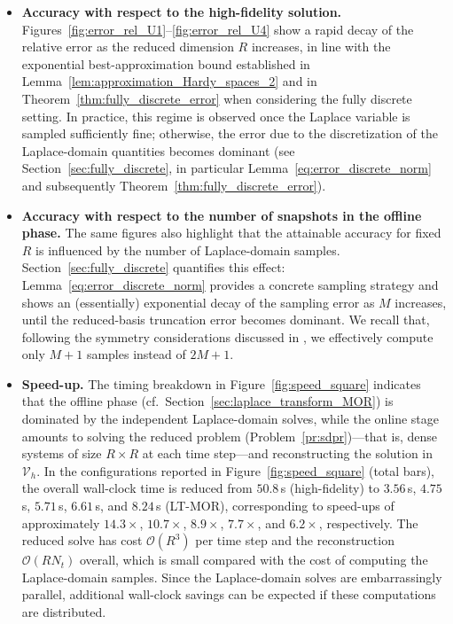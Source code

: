 \begin{itemize}
    \item[(i)]
    {\bf Accuracy with respect to the high-fidelity solution.}
    Figures~\ref{fig:error_rel_U1}--\ref{fig:error_rel_U4} show a rapid decay of the relative error as the reduced dimension $R$ increases, in line with the exponential best-approximation bound established in Lemma~\ref{lem:approximation_Hardy_spaces_2}
    and in Theorem~\ref{thm:fully_discrete_error} when considering the fully discrete setting. In practice, this regime is observed once the Laplace variable is sampled sufficiently fine; otherwise, the error due to the discretization of the Laplace-domain quantities becomes dominant (see Section~\ref{sec:fully_discrete}, in particular Lemma~\ref{eq:error_discrete_norm} and subsequently Theorem~\ref{thm:fully_discrete_error}).

    \item[(ii)]
    {\bf Accuracy with respect to the number of snapshots in the offline phase.}
    The same figures also highlight that the attainable accuracy for fixed $R$ is influenced by the number of Laplace-domain samples. Section~\ref{sec:fully_discrete} quantifies this effect: Lemma~\ref{eq:error_discrete_norm} provides a concrete sampling strategy and shows an (essentially) exponential decay of the sampling error as $M$ increases, until the reduced-basis truncation error becomes dominant. We recall that, following the symmetry considerations discussed in \cite[Section~5.4]{henriquez2024fast}, we effectively compute only $M+1$ samples instead of $2M+1$.

    \item[(iii)]
    {\bf Speed-up.}
    The timing breakdown in Figure~\ref{fig:speed_square} indicates that the offline phase (cf.~Section~\ref{sec:laplace_transform_MOR}) is dominated by the independent Laplace-domain solves, while the online stage amounts to solving the reduced problem (Problem~\ref{pr:sdpr})---that is, dense systems of size $R\times R$ at each time step---and reconstructing the solution in $\mathcal{V}_h$. In the configurations reported in Figure~\ref{fig:speed_square} (total bars), the overall wall-clock time is reduced from $50.8\,$s (high-fidelity) to $3.56\,$s, $4.75\,$s, $5.71\,$s, $6.61\,$s, and $8.24\,$s (LT-MOR), corresponding to speed-ups of approximately $14.3\times$, $10.7\times$, $8.9\times$, $7.7\times$, and $6.2\times$, respectively. The reduced solve has cost $\mathcal{O}(R^3)$ per time step and the reconstruction $\mathcal{O}(R N_t)$ overall, which is small compared with the cost of computing the Laplace-domain samples. Since the Laplace-domain solves are embarrassingly parallel, additional wall-clock savings can be expected if these computations are distributed.
\end{itemize}



